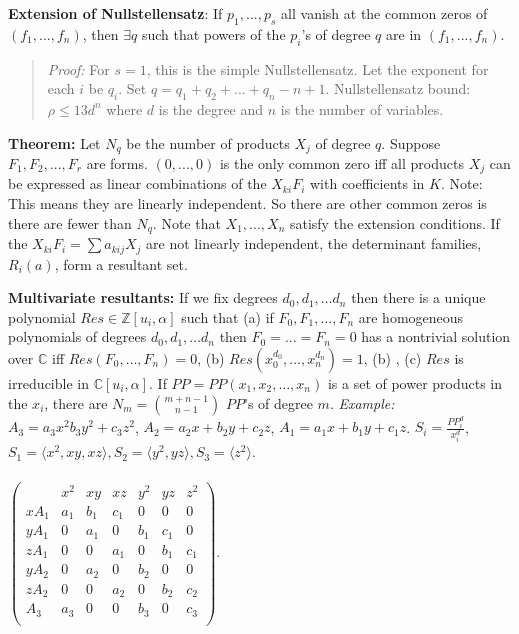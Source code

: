 {\bf Extension of Nullstellensatz}:  If $p_1, ..., p_s$ all vanish at the common zeros of
$(f_1,...,f_n)$, then $\exists q$ such that powers of the $p_i$'s of degree $q$
are in $(f_1,...,f_n)$.
\begin{quote}
\emph{Proof:}  For $s=1$, this is the simple Nullstellensatz.  Let the exponent for each $i$ be
$q_i$.  Set $q= q_1 + q_2 + ...+ q_n -n +1$.
Nullstellensatz bound: $\rho \leq 13 d^n$ where $d$ is the degree and $n$ is the number of
variables.
\end{quote}
{\bf Theorem:}  
Let $N_q$ be the number of products $X_j$ of degree $q$.
Suppose $F_1, F_2,..., F_r$ are forms.  $(0,...,0)$ is the only common zero
iff all products $X_j$ can be expressed as linear combinations of the $X_{ki}F_i$ 
with coefficients in $K$.
Note:  This means they are linearly independent.  So there are other common zeros is
there are fewer than $N_q$.  Note that $X_1, ..., X_n$ satisfy the extension conditions.  
If the $X_{ki}F_i= \sum a_{kij}X_j$
are not linearly independent, the determinant families, $R_i(a)$, form a resultant set.
\begin{quote}
\end{quote}
{\bf Multivariate resultants:}  If we fix degrees 
$d_0,d_1, \ldots d_n$ 
then there is a unique
polynomial $Res \in {\mathbb Z}[u_i , \alpha]$ such that (a) if $F_0, F_1, \ldots , F_n$
are homogeneous polynomials of degrees
$d_0,d_1, \ldots d_n$ then $F_0= \ldots = F_n=0$ has a nontrivial solution over
${\mathbb C}$ iff 
$Res(F_0, \ldots , F_n)=0$, (b) 
$Res(x_0^{d_0}, \ldots , x_n^{d_n})=1$, (b) 
, (c) $Res$ is irreducible
in ${\mathbb C}[u_i, \alpha]$.  If $PP=PP(x_1, x_2, \ldots, x_n)$ is a set of
power products in the $x_i$, there are $N_m= {{m+n-1} \choose {n-1}}$  $PP$'s of degree
$m$.  \emph{Example:} 
$A_3=a_3x^2b_3y^2+c_3z^2$,
$A_2=a_2x+b_2y+c_2z$,
$A_1=a_1x+b_1y+c_1z$.  $S_i= {\frac {PP_i^d} {x_i^d}}$,
$S_1= \langle x^2, xy, xz \rangle, S_2=\langle y^2, yz \rangle, S_3= \langle z^2 \rangle$.
\\
\\
$\left(
\begin{array}{c|cccccc}
 & x^2 & xy & xz & y^2 & yz & z^2 \\
\hline
xA_1 & a_1 & b_1 & c_1 & 0 & 0 & 0 \\
yA_1 & 0 & a_1 & 0 & b_1 & c_1 & 0 \\
zA_1 & 0 & 0 & a_1&  0 & b_1 & c_1 \\
yA_2 & 0 & a_2 & 0 & b_2 & 0 & 0 \\
zA_2 & 0 & 0 & a_2 & 0 & b_2 & c_2 \\
A_3 & a_3 & 0 & 0 & b_3 & 0 & c_3 \\
\end{array}
\right)
$.
